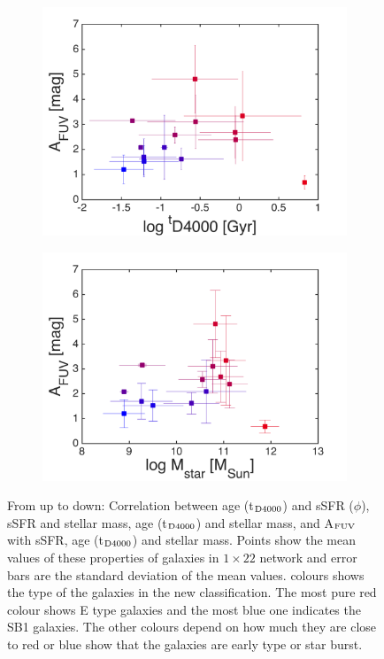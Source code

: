 \begin{figure}
\begin{subfigure}[b]{0.3\textwidth}
            \includegraphics[width=\textwidth]{../images0.01/1d/f5.png}
        \end{subfigure}
       \hfill
        \begin{subfigure}[b]{0.3\textwidth}
            \includegraphics[width=\textwidth]{../images0.01/1d/f6.png}
        \end{subfigure}
        \caption{From up to down: Correlation between age (t$_{\rm {D4000}}$) and sSFR ($\phi$), sSFR and stellar mass, age (t$_{\rm {D4000}}$) and stellar mass, and A$_{\rm {FUV}}$ with sSFR, age (t$_{\rm {D4000}}$) and stellar mass. Points show the mean values of these properties of galaxies in $1\times22$ network and error bars are the standard deviation of the mean values. colours shows the type of the galaxies in the new classification. The most pure red colour shows E type galaxies and the most blue one indicates the SB1 galaxies. The other colours depend on how much they are close to red or blue show that the galaxies are early type or star burst.}
        \label{fig: props_vs_props}
    \end{figure}
        
